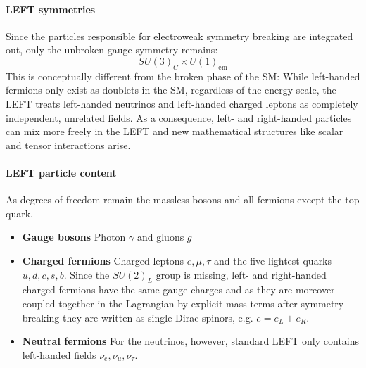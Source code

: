 \paragraph{LEFT symmetries}
Since the particles responsible for electroweak symmetry breaking are integrated out, only the unbroken gauge symmetry remains:
\begin{equation}
    SU(3)_C \times U(1)_\text{em}
\end{equation}
This is conceptually different from the broken phase of the SM:  While left-handed fermions only exist as doublets in the SM, regardless of the energy scale, the LEFT treats left-handed neutrinos and left-handed charged leptons as completely independent, unrelated fields. As a consequence, left- and right-handed particles can mix more freely in the LEFT and new mathematical structures like scalar and tensor interactions arise.
\paragraph{LEFT particle content}
As degrees of freedom remain the massless bosons and all fermions except the top quark.
\begin{itemize}
    \item \textbf{Gauge bosons} Photon $\gamma$ and gluons $g$
    \item \textbf{Charged fermions} Charged leptons $e,\mu,\tau$ and the five lightest quarks $u,d,c,s,b$. Since the $SU(2)_L$ group is missing, left- and right-handed charged fermions have the same gauge charges and as they are moreover coupled together in the Lagrangian by explicit mass terms after symmetry breaking they are written as single Dirac spinors, e.g. $e=e_L+e_R$.
    \item \textbf{Neutral fermions} For the neutrinos, however, standard LEFT only contains left-handed fields $\nu_e,\nu_\mu,\nu_\tau$.
\end{itemize}
